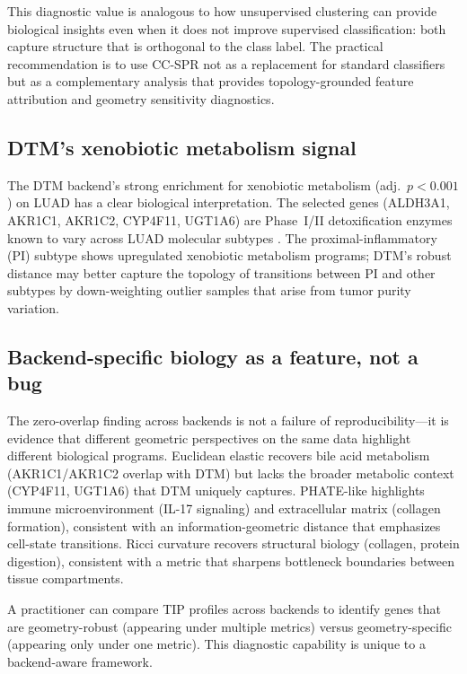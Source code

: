 \documentclass[11pt]{article}
\begin{document}
This diagnostic value is analogous to how unsupervised clustering can provide biological insights even when it does not improve supervised classification: both capture structure that is orthogonal to the class label.
The practical recommendation is to use CC-SPR not as a replacement for standard classifiers but as a complementary analysis that provides topology-grounded feature attribution and geometry sensitivity diagnostics.

\subsection{DTM's xenobiotic metabolism signal}

The DTM backend's strong enrichment for xenobiotic metabolism (adj.\ $p < 0.001$) on LUAD has a clear biological interpretation.
The selected genes (ALDH3A1, AKR1C1, AKR1C2, CYP4F11, UGT1A6) are Phase~I/II detoxification enzymes known to vary across LUAD molecular subtypes \cite{rizvi2017}.
The proximal-inflammatory (PI) subtype shows upregulated xenobiotic metabolism programs; DTM's robust distance may better capture the topology of transitions between PI and other subtypes by down-weighting outlier samples that arise from tumor purity variation.

\subsection{Backend-specific biology as a feature, not a bug}

The zero-overlap finding across backends is not a failure of reproducibility---it is evidence that different geometric perspectives on the same data highlight different biological programs.
Euclidean elastic recovers bile acid metabolism (AKR1C1/AKR1C2 overlap with DTM) but lacks the broader metabolic context (CYP4F11, UGT1A6) that DTM uniquely captures.
PHATE-like highlights immune microenvironment (IL-17 signaling) and extracellular matrix (collagen formation), consistent with an information-geometric distance that emphasizes cell-state transitions.
Ricci curvature recovers structural biology (collagen, protein digestion), consistent with a metric that sharpens bottleneck boundaries between tissue compartments.

A practitioner can compare TIP profiles across backends to identify genes that are geometry-robust (appearing under multiple metrics) versus geometry-specific (appearing only under one metric).
This diagnostic capability is unique to a backend-aware framework.
\end{document}
